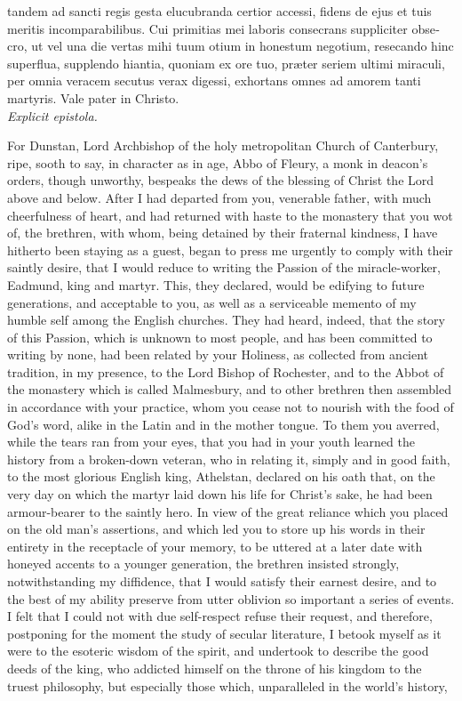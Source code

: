 \documentclass[10pt]{book}
\begin{document}
\begin{paracol}{2}
\begin{otherlanguage}{latin}
tandem ad sancti regis gesta elucubranda certior accessi, fidens de ejus et tuis meritis incomparabilibus. Cui primitias mei laboris consecrans suppliciter obsecro, ut vel una die vertas mihi tuum otium in honestum negotium, resecando hinc superflua, supplendo hiantia, quoniam ex ore tuo, pr\ae{}ter seriem ultimi miraculi, per omnia veracem secutus verax digessi, exhortans omnes ad amorem tanti martyris. Vale pater in Christo.\\{\phantom{ }\hfill\fontsize{8}{10} \selectfont\emph{Explicit epistola.}\hfill}
\end{otherlanguage}

\switchcolumn

For Dunstan, Lord Archbishop of the holy metropolitan Church of Canterbury, ripe, sooth to say, in character as in age, Abbo of Fleury, a monk in deacon's orders, though unworthy, bespeaks the dews of the blessing of Christ the Lord above and below. After I had departed from you, venerable father, with much cheerfulness of heart, and had returned with haste to the monastery that you wot of, the brethren, with whom, being detained by their fraternal kindness, I have hitherto been staying as a guest, began to press me urgently to comply with their saintly desire, that I would reduce to writing the Passion of the miracle-worker, Eadmund, king and martyr. This, they declared, would be edifying to future generations, and acceptable to you, as well as a serviceable memento of my humble self among the English churches. They had heard, indeed, that the story of this Passion, which is unknown to most people, and has been committed to writing by none, had been related by your Holiness, as collected from ancient tradition, in my presence, to the Lord Bishop of Rochester, and to the Abbot of the monastery which is called Malmesbury, and to other brethren then assembled in accordance with your practice, whom you cease not to nourish with the food of God's word, alike in the Latin and in the mother tongue. To them you averred, while the tears ran from your eyes, that you had in your youth learned the history from a broken-down veteran, who in relating it, simply and in good faith, to the most glorious English king, Athelstan, declared on his oath that, on the very day on which the martyr laid down his life for Christ's sake, he had been armour-bearer to the saintly hero. In view of the great reliance which you placed on the old man's assertions, and which led you to store up his words in their entirety in the receptacle of your memory, to be uttered at a later date with honeyed accents to a younger generation, the brethren insisted strongly, notwithstanding my diffidence, that I would satisfy their earnest desire, and to the best of my ability preserve from utter oblivion so important a series of events. I felt that I could not with due self-respect refuse their request, and therefore, postponing for the moment the study of secular literature, I betook myself as it were to the esoteric wisdom of the spirit, and undertook to describe the good deeds of the king, who addicted himself on the throne of his kingdom to the truest philosophy, but especially those which, unparalleled in the world's history, 
\end{paracol}
\end{document}
